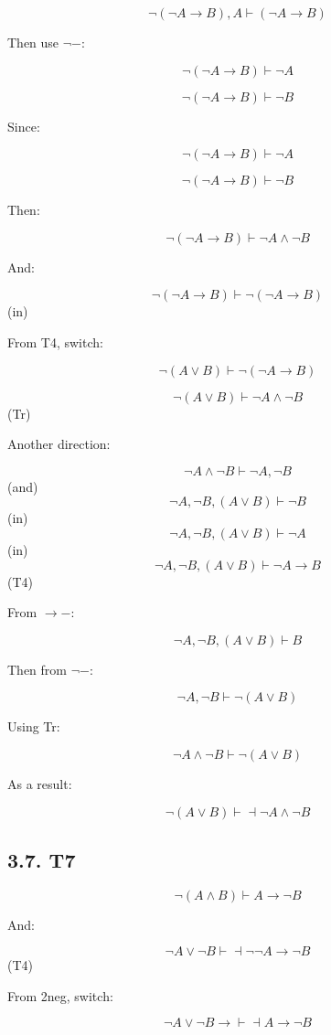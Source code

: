 \documentclass{article} %
\begin{document}
\[\neg(\neg A \rightarrow B) , A\vdash (\neg A \rightarrow B)\]

Then use \(\neg-\):

\[\neg(\neg A \rightarrow B) \vdash \neg A\]

\[\neg(\neg A \rightarrow B) \vdash \neg B\]

Since:

\[\neg(\neg A \rightarrow B) \vdash \neg A\]

\[\neg(\neg A \rightarrow B) \vdash \neg B\]

Then:

\[\neg(\neg A \rightarrow B) \vdash \neg A \wedge \neg B\]

And:

\[\neg (\neg A \rightarrow B)\vdash \neg(\neg A \rightarrow B)\] (in)

From T4, switch:

\[\neg (A \vee B)\vdash \neg(\neg A \rightarrow B)\]

\[\neg (A \vee B) \vdash \neg A \wedge \neg B\] (Tr)

Another direction:

\[\neg A \wedge \neg B \vdash \neg A, \neg B \] (and)
\[\neg A ,\neg B , (A \vee B) \vdash \neg B \] (in)
\[\neg A ,\neg B , (A \vee B) \vdash \neg A \] (in)
\[\neg A ,\neg B , (A \vee B) \vdash \neg A \rightarrow B\] (T4)

From \(\rightarrow-\):

\[\neg A ,\neg B , (A \vee B) \vdash B\]

Then from \(\neg -\):

\[\neg A ,\neg B \vdash \neg (A \vee B) \]

Using Tr:

\[\neg A \wedge \neg B \vdash \neg (A \vee B) \]

As a result:

\[\neg (A \vee B) \vdash \dashv \neg A \wedge \neg B\]

\hypertarget{t7}{%
\subsection{3.7. T7}\label{t7}}

\[\neg (A \wedge B) \vdash A \rightarrow \neg B\]

And:

\[ \neg A \vee \neg B \vdash \dashv \neg \neg A \rightarrow \neg B\]
(T4)

From 2neg, switch:

\[ \neg A \vee \neg B \rightarrow \vdash \dashv A \rightarrow \neg B\]
\end{document}
